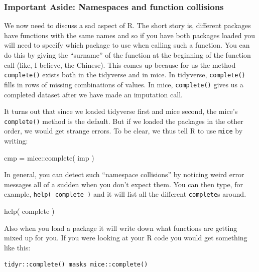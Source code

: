 \documentclass[
  letterpaper,
  DIV=11,
  numbers=noendperiod]{scrreprt}
\newenvironment{Shaded}{\begin{snugshade}}{\end{snugshade}}
\newcommand{\FunctionTok}[1]{\textcolor[rgb]{0.02,0.16,0.49}{#1}}
\newcommand{\NormalTok}[1]{\textcolor[rgb]{0.00,0.44,0.13}{#1}}
\newcommand{\OtherTok}[1]{\textcolor[rgb]{0.00,0.44,0.13}{#1}}
\newcommand{\SpecialCharTok}[1]{\textcolor[rgb]{0.25,0.44,0.63}{#1}}
\begin{document}
\hypertarget{important-aside-namespaces-and-function-collisions}{%
\subsubsection{Important Aside: Namespaces and function
collisions}\label{important-aside-namespaces-and-function-collisions}}

We now need to discuss a sad aspect of R. The short story is, different
packages have functions with the same names and so if you have both
packages loaded you will need to specify which package to use when
calling such a function. You can do this by giving the ``surname'' of
the function at the beginning of the function call (like, I believe, the
Chinese). This comes up because for us the method \texttt{complete()}
exists both in the tidyverse and in mice. In tidyverse,
\texttt{complete()} fills in rows of missing combinations of values. In
mice, \texttt{complete()} gives us a completed dataset after we have
made an imputation call.

It turns out that since we loaded tidyverse first and mice second, the
mice's \texttt{complete()} method is the default. But if we loaded the
packages in the other order, we would get strange errors. To be clear,
we thus tell R to use \texttt{mice} by writing:

\begin{Shaded}
\begin{Highlighting}[]
\NormalTok{  cmp }\OtherTok{=}\NormalTok{ mice}\SpecialCharTok{::}\FunctionTok{complete}\NormalTok{( imp )}
\end{Highlighting}
\end{Shaded}

In general, you can detect such ``namespace collisions'' by noticing
weird error messages all of a sudden when you don't expect them. You can
then type, for example, \texttt{help(\ complete\ )} and it will list all
the different \texttt{complete}s around.

\begin{Shaded}
\begin{Highlighting}[]
  \FunctionTok{help}\NormalTok{( complete )}
\end{Highlighting}
\end{Shaded}

Also when you load a package it will write down what functions are
getting mixed up for you. If you were looking at your R code you would
get something like this:

\begin{verbatim}
tidyr::complete() masks mice::complete()
\end{verbatim}
\end{document}
